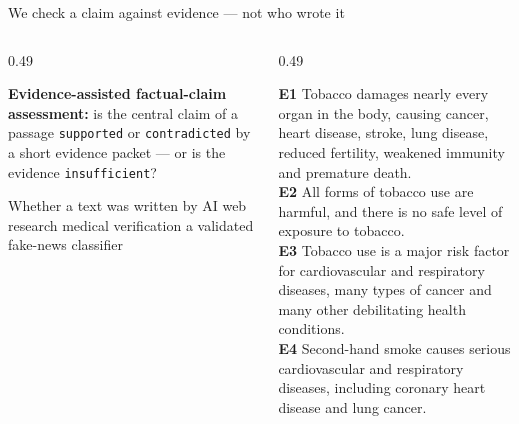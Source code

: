 \begin{frame}{We check a claim against evidence --- not who wrote it}
  \begin{columns}[T,onlytextwidth]
    \begin{column}{0.49\textwidth}
      \begin{solutionbox}
        \footnotesize \textbf{Evidence-assisted factual-claim assessment:} is the central claim of a passage
        \texttt{supported} or \texttt{contradicted} by a short evidence packet --- or is the evidence
        \texttt{insufficient}?
      \end{solutionbox}
      \begin{mistake}
        \footnotesize Whether a text was written by AI \textperiodcentered{} web research \textperiodcentered{}
        medical verification \textperiodcentered{} a validated fake-news classifier
      \end{mistake}
    \end{column}
    \begin{column}{0.49\textwidth}
      \begin{readme}
        \scriptsize
        \textbf{E1} Tobacco damages nearly every organ in the body, causing cancer, heart disease,
        stroke, lung disease, reduced fertility, weakened immunity and premature death.\\[0.5mm]
        \textbf{E2} All forms of tobacco use are harmful, and there is no safe level of exposure to tobacco.\\[0.5mm]
        \textbf{E3} Tobacco use is a major risk factor for cardiovascular and respiratory diseases, many
        types of cancer and many other debilitating health conditions.\\[0.5mm]
        \textbf{E4} Second-hand smoke causes serious cardiovascular and respiratory diseases, including
        coronary heart disease and lung cancer.
      \end{readme}
    \end{column}
  \end{columns}
\end{frame}

